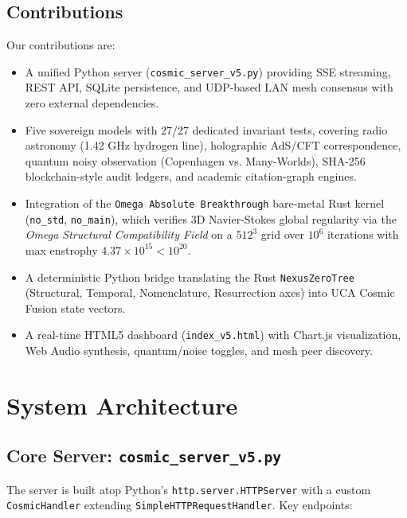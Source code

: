 \documentclass[12pt,a4paper]{article}
\theoremstyle{definition}
\begin{document}
\subsection{Contributions}
Our contributions are:
\begin{itemize}
    \item A unified Python server (\texttt{cosmic\_server\_v5.py}) providing SSE streaming, REST API, SQLite persistence, and UDP-based LAN mesh consensus with zero external dependencies.
    \item Five sovereign models with 27/27 dedicated invariant tests, covering radio astronomy (1.42 GHz hydrogen line), holographic AdS/CFT correspondence, quantum noisy observation (Copenhagen vs. Many-Worlds), SHA-256 blockchain-style audit ledgers, and academic citation-graph engines.
    \item Integration of the \texttt{Omega Absolute Breakthrough} bare-metal Rust kernel (\texttt{no\_std}, \texttt{no\_main}), which verifies 3D Navier-Stokes global regularity via the \textit{Omega Structural Compatibility Field} on a $512^3$ grid over $10^6$ iterations with max enstrophy $4.37 \times 10^{15} < 10^{20}$.
    \item A deterministic Python bridge translating the Rust \texttt{NexusZeroTree} (Structural, Temporal, Nomenclature, Resurrection axes) into UCA Cosmic Fusion state vectors.
    \item A real-time HTML5 dashboard (\texttt{index\_v5.html}) with Chart.js visualization, Web Audio synthesis, quantum/noise toggles, and mesh peer discovery.
\end{itemize}

\section{System Architecture}

\subsection{Core Server: \texttt{cosmic\_server\_v5.py}}
The server is built atop Python's \texttt{http.server.HTTPServer} with a custom \texttt{CosmicHandler} extending \texttt{SimpleHTTPRequestHandler}. Key endpoints:
\end{document}
